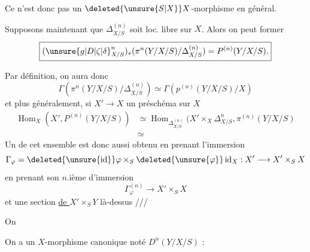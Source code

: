 Ce n'est donc pas un $\deleted{\unsure{S|X}}X$-morphisme en général.

Supposons maintenant que $\Delta^{(n)}_{X/S}$ soit    loc. libre sur $X$. Alors on peut former
\[
\boxed{({\unsure{g|D|\zeta|\delta}}^n_{X/S})_*(\pi^n(Y/X/S)/\Delta^{(n)}_{X/S})=P^{(n)}(Y/X/S).}
\]

Par définition, on aura donc
\[
\Gamma(\pi^n(Y/X/S)/\Delta^{(n)}_{X/S})\simeq\Gamma(p^{(n)}(Y/X/S)/X)
\]
et  plus généralement, si \inserted{$\varphi:$} $X'\longrightarrow X$ un préschéma sur $X$
\[
\begin{aligned}
\operatorname{Hom}_X(X',P^{(n)}(Y/X/S))&\simeq\operatorname{Hom}_{\Delta^{(n)}_{X/S}}(X'\times_X\Delta^n_{X/S},\pi^{(n)}(Y/X/S)\\
&\simeq
\end{aligned}
\]
Un  de cet ensemble est donc aussi obtenu en prenant l'immersion
\[
\Gamma_\varphi=\deleted{\unsure{\operatorname{id}}}\varphi\times_S\deleted{\unsure{\varphi}}\operatorname{id}_X:X'\longrightarrow X'\times_S X
\]
en prenant son $n$.ième  d'immersion
\[
\Gamma_\varphi^{(n)}\longrightarrow X'\times_S X
\]
et une section \uline{de $X'$}$\times_S Y$ là-dessus ///

On 

On a un $X$-morphisme canonique  noté $D^n(Y/X/S)$ :

